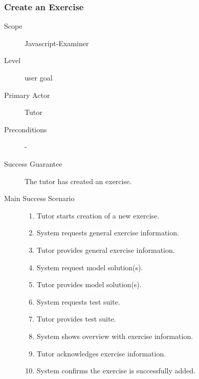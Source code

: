\subsubsection{Create an Exercise}
\begin{mdframed} [rightmargin=-100pt]
\begin{description}
  \item[Scope] Javascript-Examiner
  \item[Level] user goal
  \item[Primary Actor] Tutor
  \item[Preconditions] -
  \item[Success Guarantee] The tutor has created an exercise.
  \item[Main Success Scenario] \mbox{}
	\begin{enumerate}
	  \item Tutor starts creation of a new exercise.
	  \item System requests general exercise information.
	  \item Tutor provides general exercise information.
    \item System request model solution(s).
    \item Tutor provides model solution(s).
    \item System requests test suite.
    \item Tutor provides test suite.
    \item System shows overview with exercise information.
    \item Tutor acknowledges exercise information.
    \item System confirms the exercise is successfully added.
	\end{enumerate}
\end{description}
\end{mdframed}


